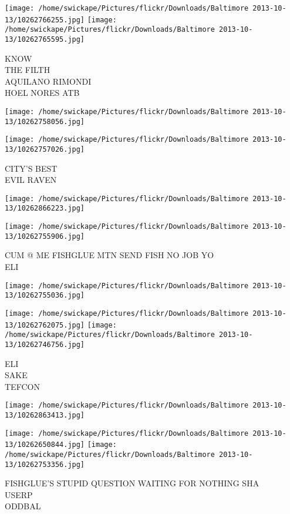 \documentclass[10pt,letterpaper]{article}
\begin{document}
\texttt{[image: /home/swickape/Pictures/flickr/Downloads/Baltimore 2013-10-13/10262766255.jpg]}
\texttt{[image: /home/swickape/Pictures/flickr/Downloads/Baltimore 2013-10-13/10262765595.jpg]}

KNOW\\
THE FILTH\\
AQUILANO RIMONDI\\
HOEL NORES ATB
\pagebreak

\texttt{[image: /home/swickape/Pictures/flickr/Downloads/Baltimore 2013-10-13/10262758056.jpg]}

\vspace{0.25in}
\texttt{[image: /home/swickape/Pictures/flickr/Downloads/Baltimore 2013-10-13/10262757026.jpg]}

CITY'S BEST\\
EVIL RAVEN
\pagebreak

\texttt{[image: /home/swickape/Pictures/flickr/Downloads/Baltimore 2013-10-13/10262866223.jpg]}

\vspace{0.25in}
\texttt{[image: /home/swickape/Pictures/flickr/Downloads/Baltimore 2013-10-13/10262755906.jpg]}

CUM @ ME FISHGLUE MTN SEND FISH NO JOB YO\\
ELI
\pagebreak

\texttt{[image: /home/swickape/Pictures/flickr/Downloads/Baltimore 2013-10-13/10262755036.jpg]}

\vspace{0.25in}
\texttt{[image: /home/swickape/Pictures/flickr/Downloads/Baltimore 2013-10-13/10262762075.jpg]}
\texttt{[image: /home/swickape/Pictures/flickr/Downloads/Baltimore 2013-10-13/10262746756.jpg]}

ELI\\
SAKE\\
TEFCON
\pagebreak

\texttt{[image: /home/swickape/Pictures/flickr/Downloads/Baltimore 2013-10-13/10262863413.jpg]}

\vspace{0.25in}
\texttt{[image: /home/swickape/Pictures/flickr/Downloads/Baltimore 2013-10-13/10262650844.jpg]}
\texttt{[image: /home/swickape/Pictures/flickr/Downloads/Baltimore 2013-10-13/10262753356.jpg]}

FISHGLUE'S STUPID QUESTION WAITING FOR NOTHING SHA\\
USERP\\
ODDBAL
\pagebreak
\end{document}
